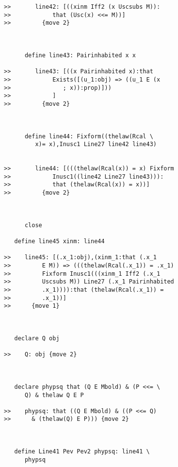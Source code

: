 \documentclass[12pt]{article}
\begin{document}
\begin{verbatim}
>>       line42: [((xinm Iff2 (x Uscsubs M)):
>>            that (Usc(x) <<= M))]
>>         {move 2}



      define line43: Pairinhabited x x

>>       line43: [((x Pairinhabited x):that
>>            Exists([(u_1:obj) => ((u_1 E (x
>>               ; x)):prop)]))
>>            ]
>>         {move 2}



      define line44: Fixform((thelaw(Rcal \
         x)= x),Inusc1 Line27 line42 line43)


>>       line44: [(((thelaw(Rcal(x)) = x) Fixform
>>            Inusc1((line42 Line27 line43))):
>>            that (thelaw(Rcal(x)) = x))]
>>         {move 2}



      close

   define line45 xinm: line44

>>    line45: [(.x_1:obj),(xinm_1:that (.x_1
>>         E M)) => (((thelaw(Rcal(.x_1)) = .x_1)
>>         Fixform Inusc1(((xinm_1 Iff2 (.x_1
>>         Uscsubs M)) Line27 (.x_1 Pairinhabited
>>         .x_1)))):that (thelaw(Rcal(.x_1)) =
>>         .x_1))]
>>      {move 1}



   declare Q obj

>>    Q: obj {move 2}



   declare phypsq that (Q E Mbold) & (P <<= \
      Q) & thelaw Q E P

>>    phypsq: that ((Q E Mbold) & ((P <<= Q)
>>      & (thelaw(Q) E P))) {move 2}



   define Line41 Pev Pev2 phypsq: line41 \
      phypsq


\end{verbatim}
\end{document}
